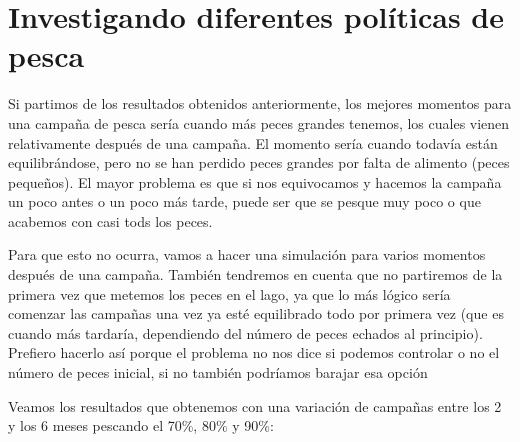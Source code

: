 \documentclass[11pt,a4paper]{report}
\begin{document}
\section{Investigando diferentes políticas de pesca}

Si partimos de los resultados obtenidos anteriormente, los mejores momentos para una campaña de pesca sería cuando más peces grandes tenemos,
los cuales vienen relativamente después de una campaña. El momento sería cuando todavía están equilibrándose, pero no se han perdido peces
grandes por falta de alimento (peces pequeños). El mayor problema es que si nos equivocamos y hacemos la campaña un poco antes o un poco más
tarde, puede ser que se pesque muy poco o que acabemos con casi tods los peces.

Para que esto no ocurra, vamos a hacer una simulación para varios momentos después de una campaña. También tendremos en cuenta que no partiremos
de la primera vez que metemos los peces en el lago, ya que lo más lógico sería comenzar las campañas una vez ya esté equilibrado todo por primera
vez (que es cuando más tardaría, dependiendo del número de peces echados al principio). Prefiero hacerlo así porque el problema no nos dice si
podemos controlar o no el número de peces inicial, si no también podríamos barajar esa opción

Veamos los resultados que obtenemos con una variación de campañas entre los 2 y los 6 meses pescando el 70\%, 80\% y 90\%:
\end{document}
